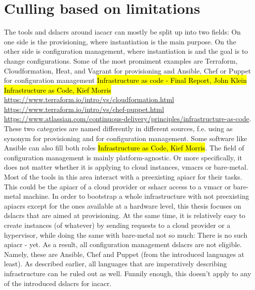 \section{Culling based on limitations}
The tools and \gls{dslacr}s around \gls{iacacr} can mostly be split up into two fields: On one side is the provisioning, where instantiation is the main purpose. On the other side is configuration management, where instantiation is  and the goal is to change configurations. Some of the most promiment examples are Terraform, Cloudformation, Heat, and Vagrant for provisioning and Ansible, Chef or Puppet for configuration management \hl{Infrastructure as code - Final Report, John Klein} \hl{Infrastructure as Code, Kief Morris} \url{https://www.terraform.io/intro/vs/cloudformation.html} \url{https://www.terraform.io/intro/vs/chef-puppet.html} \url{https://www.atlassian.com/continuous-delivery/principles/infrastructure-as-code}.
\newline
These two categories are named differently in different sources, f.e. using  as synonym for provisioning and  for configuration management. Some software like Ansible can also fill both roles \hl{Infrastructure as Code, Kief Morris}.
\newline
The field of configuration management is mainly platform-agnostic. Or more specifically, it does not matter whether it is applying to cloud instances, \gls{vmacr}s or bare-metal. Most of the tools in this area interact with a preexisting \gls{apiacr} for their tasks. This could be the \gls{apiacr} of a cloud provider or \gls{sshacr} access to a \gls{vmacr} or bare-metal machine.
\newline
In order to bootstrap a whole infrastructure with not preexisting \gls{apiacr}s except for the ones available at a hardware level, this thesis focuses on \gls{dslacr}s that are aimed at provisioning. At the same time, it is relatively easy to create instances (of whatever) by sending requests to a cloud provider or a hypervisor, while doing the same with bare-metal not so much: There is no such \gls{apiacr} - yet.
\newline
As a result, all configuration management \gls{dslacr}s are not eligible. Namely, these are Ansible, Chef and Puppet (from the introduced languages at least).
\newline
As described earlier, all languages that are imperatively describing infrastructure can be ruled out as well. Funnily enough, this doesn't apply to any of the introduced \gls{dslacr}s for \gls{iacacr}.
